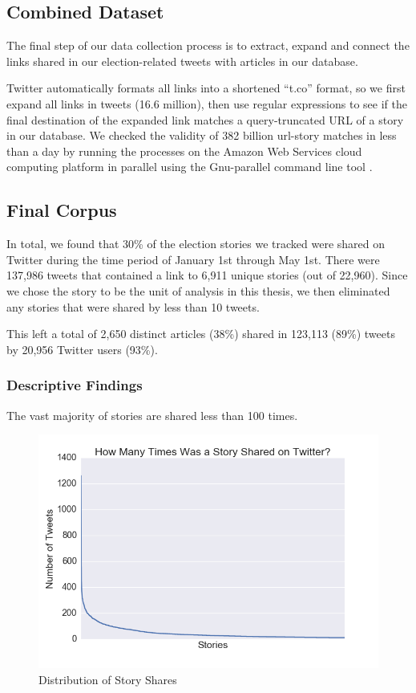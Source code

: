 \documentclass[letterpaper]{article}
\begin{document}
\subsection{Combined Dataset}
The final step of our data collection process is to extract, expand and connect the links shared in our election-related tweets with articles in our database.
 
Twitter automatically formats all links into a shortened ``t.co'' format, so we first expand all links in tweets (16.6 million), then use regular expressions to see if the final destination of the expanded link matches a query-truncated URL of a story in our database. We checked the validity of 382 billion url-story matches in less than a day by running the processes on the Amazon Web Services cloud computing platform in parallel using the Gnu-parallel command line tool \cite{tange2011gnu}.

\subsection{Final Corpus}

In total, we found that 30\% of the election stories we tracked were shared on Twitter during the time period of January 1st through May 1st. There were 137,986 tweets that contained a link to 6,911 unique stories (out of 22,960). Since we chose the story to be the unit of analysis in this thesis, we then eliminated any stories that were shared by less than 10 tweets.

This left a total of 2,650 distinct articles (38\%) shared in 123,113 (89\%) tweets by 20,956 Twitter users (93\%).

\subsubsection{Descriptive Findings}
The vast majority of stories are shared less than 100 times. 

\begin{figure}[t!]
\centering 
  \includegraphics[width=\columnwidth]{story-share-dist}  
  \caption{Distribution of Story Shares
    \label{fig:story-share-dist}}
\end{figure} 
\end{document}

